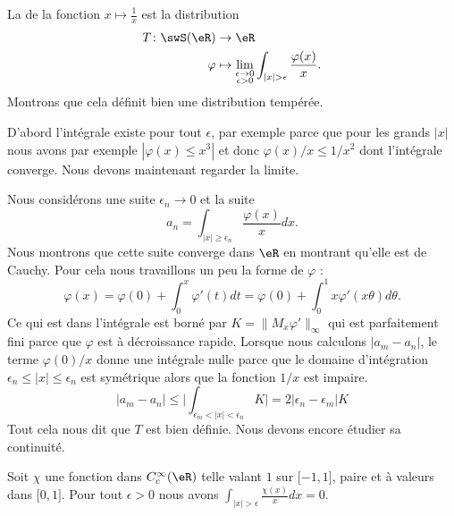 \begin{example}
    La  de la fonction \( x\mapsto \frac{1}{ x }\) est la distribution
    \begin{equation}
        \begin{aligned}
            T\colon \swS(\eR)&\to \eR \\
            \varphi&\mapsto \lim_{\substack{\epsilon\to 0\\\epsilon>0}}\int_{| x |>\epsilon}\frac{ \varphi(x) }{ x }.
        \end{aligned}
    \end{equation}
    Montrons que cela définit bien une distribution tempérée.

    D'abord l'intégrale existe pour tout \( \epsilon\), par exemple parce que pour les grands \( | x |\) nous avons par exemple \( | \varphi(x)\leq x^3 |\) et donc \( \varphi(x)/x\leq 1/x^2\) dont l'intégrale converge. Nous devons maintenant regarder la limite.

    Nous considérons une suite \( \epsilon_n\to 0\) et la suite
    \begin{equation}
        a_n=\int_{| x |\geq \epsilon_n}\frac{ \varphi(x) }{ x }dx.
    \end{equation}
    Nous montrons que cette suite converge dans \( \eR\) en montrant qu'elle est de Cauchy. Pour cela nous travaillons un peu la forme de \( \varphi\) :
    \begin{equation}
        \varphi(x)=\varphi(0)+\int_0^x\varphi'(t)dt=\varphi(0)+\int_0^1x\varphi'(x\theta)d\theta.
    \end{equation}
    Ce qui est dans l'intégrale est borné par \( K=\| M_x\varphi' \|_{\infty}\) qui est parfaitement fini parce que \( \varphi\) est à décroissance rapide. Lorsque nous calculons \( | a_m-a_n |\), le terme \( \varphi(0)/x\) donne une intégrale nulle parce que le domaine d'intégration \( \epsilon_n\leq | x |\leq \epsilon_n\) est symétrique alors que la fonction \( 1/x\) est impaire.
    \begin{equation}
        | a_m-a_n |\leq \big| \int_{\epsilon_m<| x |<\epsilon_n}K \big|=2| \epsilon_n-\epsilon_m |K
    \end{equation}
    Tout cela nous dit que \( T\) est bien définie. Nous devons encore étudier sa continuité.

    Soit \( \chi\) une fonction dans \(  C^{\infty}_c(\eR)\) telle valant \( 1\) sur \( \mathopen[ -1 , 1 \mathclose]\), paire et à valeurs dans \( \mathopen[ 0 , 1 \mathclose]\).
    Pour tout \( \epsilon>0\) nous avons \( \int_{| x |>\epsilon}\frac{ \chi(x) }{ x }dx=0\). 


\end{example}

